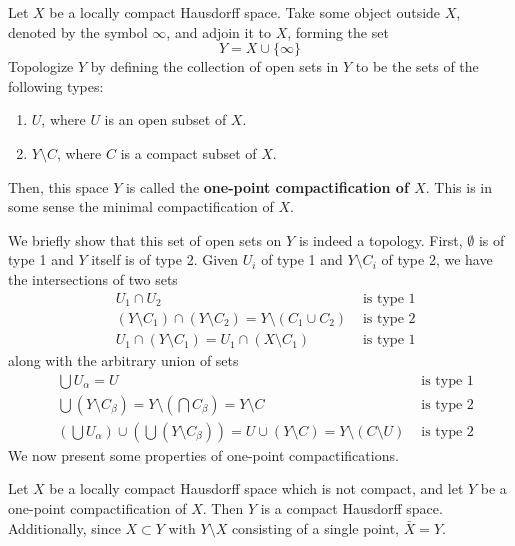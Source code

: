     \begin{definition}[Compactification]
      Let $X$ be a locally compact Hausdorff space. Take some object outside $X$, denoted by the symbol $\infty$, and adjoin it to $X$, forming the set
      \begin{equation}
        Y = X \cup \{\infty\}
      \end{equation}
      Topologize $Y$ by defining the collection of open sets in $Y$ to be the sets of the following types:
      \begin{enumerate}
        \item $U$, where $U$ is an open subset of $X$. 
        \item $Y \setminus C$, where $C$ is a compact subset of $X$.
      \end{enumerate}
      Then, this space $Y$ is called the \textbf{one-point compactification of $X$}. This is in some sense the minimal compactification of $X$. 
    \end{definition}

    We briefly show that this set of open sets on $Y$ is indeed a topology. First, $\emptyset$ is of type 1 and $Y$ itself is of type 2. Given $U_i$ of type 1 and $Y \setminus C_i$ of type 2, we have the intersections of two sets
    \begin{align*}
      &U_1 \cap U_2 & \text{ is type 1} \\
      &(Y \setminus C_1) \cap (Y \setminus C_2) = Y \setminus (C_1 \cup C_2) & \text{ is type 2} \\
      &U_1 \cap (Y \setminus C_1) = U_1 \cap (X \setminus C_1) & \text{ is type 1} 
    \end{align*}
    along with the arbitrary union of sets
    \begin{align*}
      &\bigcup U_\alpha = U & \text{ is type 1} \\
      &\bigcup (Y \setminus C_\beta) = Y \setminus (\bigcap C_\beta) = Y \setminus C & \text{ is type 2} \\
      &(\bigcup U_\alpha) \cup ( \bigcup (Y \setminus C_\beta)) = U \cup (Y \setminus C) = Y \setminus (C \setminus U) & \text{ is type 2}
    \end{align*}
    We now present some properties of one-point compactifications. 

    \begin{theorem}
      Let $X$ be a locally compact Hausdorff space which is not compact, and let $Y$ be a one-point compactification of $X$. Then $Y$ is a compact Hausdorff space. Additionally, since $X \subset Y$ with $Y \setminus X$ consisting of a single point, $\bar{X} = Y$. 
    \end{theorem}

